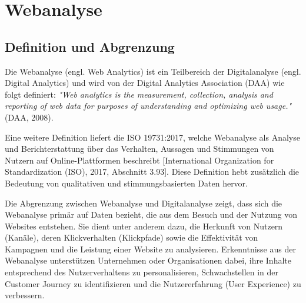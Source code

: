 \chapter{Webanalyse} %
\label{ch:webanalyse} 

\section{Definition und Abgrenzung} %
Die Webanalyse (engl. Web Analytics) ist ein Teilbereich der Digitalanalyse (engl. Digital Analytics) und wird von der Digital Analytics Association (DAA) wie folgt definiert: \textit{"Web analytics is the measurement, collection, analysis and reporting of web data for purposes of understanding and optimizing web usage."} (DAA, 2008).

Eine weitere Definition liefert die ISO 19731:2017, welche Webanalyse als Analyse und Berichterstattung über das Verhalten, Aussagen und Stimmungen von Nutzern auf Online-Plattformen beschreibt [International Organization for Standardization (ISO), 2017, Abschnitt 3.93]. Diese Definition hebt zusätzlich die Bedeutung von qualitativen und stimmungsbasierten Daten hervor.

Die Abgrenzung zwischen Webanalyse und Digitalanalyse zeigt, dass sich die Webanalyse primär auf Daten bezieht, die aus dem Besuch und der Nutzung von Websites entstehen. Sie dient unter anderem dazu, die Herkunft von Nutzern (Kanäle), deren Klickverhalten (Klickpfade) sowie die Effektivität von Kampagnen und die Leistung einer Website zu analysieren. Erkenntnisse aus der Webanalyse unterstützen Unternehmen oder Organisationen dabei, ihre Inhalte entsprechend des Nutzerverhaltens zu personalisieren, Schwachstellen in der Customer Journey zu identifizieren und die Nutzererfahrung (User Experience) zu verbessern.
